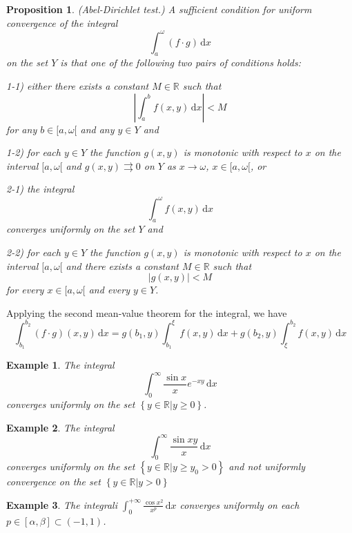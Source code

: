 \documentclass[a4paper,12pt]{article}
\newtheorem{example}{Example}             %
\newtheorem{proposition}{Proposition}
\begin{document}
\begin{CJK}{UTF8}{gbsn}
\begin{proposition}{(\emph{Abel-Dirichlet test.})}
        A sufficient condition for uniform convergence of the integral 
        \[
            \int_a^{\omega}\left(f\cdot g\right)\, \mathrm{d}x
        \]
        on the set $Y$ is that one of the following two pairs of conditions holds:

        \emph{1-1)} either there exists a constant $M \in \mathbb{R}$ such that 
        \[
            \left |\int_a^bf(x,y)\, \mathrm{d}x \right | < M
        \]
        for any $b \in [a, \omega[$ and any $y \in Y$ and 

        \emph{1-2)} for each $y \in Y$ the function $g(x,y)$ is monotonic with respect to $x$ on 
        the interval $[a, \omega[$ and $g(x,y)\rightrightarrows 0$ on $Y$ as $x \to \omega$,
        $x \in [a,\omega[$, or 

        \emph{2-1)} the integral 
        \[
            \int_a^{\omega}f(x,y)\, \mathrm{d}x
            \]
        converges uniformly on the set $Y$ and 

        \emph{2-2)} for each $y \in Y$ the function $g(x,y)$ is monotonic with respect 
        to $x$ on the interval $[a, \omega[$ and there exists a constant $M \in \mathbb{R}$
        such that 
        \[
            \left |g(x,y)\right| < M
            \]
        for every $x \in [a, \omega[$ and every $y \in Y$.
    \end{proposition}
    Applying the second mean-value theorem for the integral, we have
    \[
        \int_{b_1}^{b_2} \left(f\cdot g\right)(x,y)\, \mathrm{d}x = g(b_1,y)
        \int_{b_1}^{\xi} f(x,y)\, \mathrm{d}x + g(b_2,y)\int_{\xi}^{b_2}f(x,y)\, \mathrm{d}x
        \]

    \begin{example}
        The integral 
        \[
            \int_0^{\infty}\frac{\sin x}{x}e^{-xy}\, \mathrm{d}x
            \]
        converges uniformly on the set $\left\{y \in \mathbb{R} \vert y \ge 0 \right\}$.
    \end{example}

    \begin{example}
        The integral 
        \[
            \int_0^{\infty} \frac{\sin xy}{x}\, \mathrm{d}x
            \]
        converges uniformly on the set $\left\{y \in \mathbb{R} \vert y \ge y_0 > 0
        \right\}$ and not uniformly convergence on the set $\left\{y \in \mathbb{R} \vert y > 0
        \right\}$ 
    \end{example}

    \begin{example}
        \emph{The integrali} $\displaystyle \int_0^{+\infty} \frac{\cos x^2}{x^p}\, \mathrm{d}x$
        \emph{converges uniformly on each} $p \in [\alpha,\beta]\subset(-1,1)$.
    \end{example}


\end{CJK}
\end{document}
